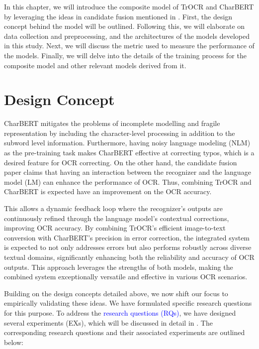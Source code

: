 \label{chap:3_method}
In this chapter, we will introduce the composite model of TrOCR and CharBERT by leveraging the ideas in candidate fusion mentioned in . First, the design concept behind the model will be outlined. Following this, we will elaborate on data collection and preprocessing, and the architectures of the models developed in this study. Next, we will discuss the metric used to measure the performance of the models. Finally, we will delve into the details of the training process for the composite model and other relevant models derived from it.
\section{Design Concept}
\label{sec:3_design_concept}
CharBERT mitigates the problems of incomplete modelling and fragile representation by including the character-level processing in addition to the subword level information. Furthermore, having noisy language modeling (NLM) as the pre-training task makes CharBERT effective at correcting typos, which is a desired feature for OCR correcting. On the other hand, the candidate fusion paper claims that having an interaction between the recognizer and the language model (LM) can enhance the performance of OCR. Thus, combining TrOCR and CharBERT is expected have an improvement on the OCR accuracy. 

This allows a dynamic feedback loop where the recognizer's outputs are continuously refined through the language model's contextual corrections, improving OCR accuracy. By combining TrOCR's efficient image-to-text conversion with CharBERT's precision in error correction, the integrated system is expected to not only addresses errors but also performs robustly across diverse textual domains, significantly enhancing both the reliability and accuracy of OCR outputs. This approach leverages the strengths of both models, making the combined system exceptionally versatile and effective in various OCR scenarios.

Building on the design concepts detailed above, we now shift our focus to empirically validating these ideas. We have formulated specific research questions for this purpose. To address the \textcolor{Blue}{research questions (RQs)}, we have designed several experiments (EXs), which will be discussed in detail in . The corresponding research questions and their associated experiments are outlined below:

